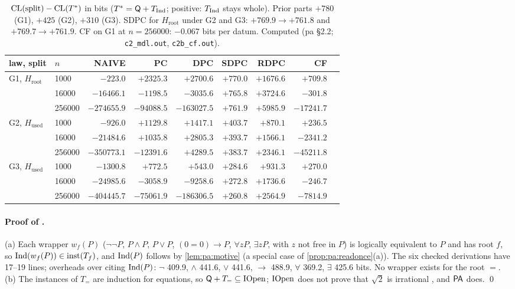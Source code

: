 \begin{table}[ht]\centering\footnotesize
\begin{tabular}{@{}llrrrrrrr@{}}
\toprule
law, split & $n$ & NAIVE & PC & DPC & SDPC & RDPC & CF\\
\midrule
G1, $H_{\mathrm{root}}$ & 1000 & $-223.0$ & $+2325.3$ & $+2700.6$ & $+770.0$ & $+1676.6$ & $+709.8$\\
 & 16000 & $-16466.1$ & $-1198.5$ & $-3035.6$ & $+765.8$ & $+3724.6$ & $-301.8$\\
 & 256000 & $-274655.9$ & $-94088.5$ & $-163027.5$ & $+761.9$ & $+5985.9$ & $-17241.7$\\
G2, $H_{\mathrm{used}}$ & 1000 & $-926.0$ & $+1129.8$ & $+1417.1$ & $+403.7$ & $+870.1$ & $+236.5$\\
 & 16000 & $-21484.6$ & $+1035.8$ & $+2805.3$ & $+393.7$ & $+1566.1$ & $-2341.2$\\
 & 256000 & $-350773.1$ & $-12391.6$ & $+4289.5$ & $+383.7$ & $+2346.1$ & $-45211.8$\\
G3, $H_{\mathrm{used}}$ & 1000 & $-1300.8$ & $+772.5$ & $+543.0$ & $+284.6$ & $+931.3$ & $+270.0$\\
 & 16000 & $-24985.6$ & $-3058.9$ & $-9258.6$ & $+272.8$ & $+1736.6$ & $-246.7$\\
 & 256000 & $-404445.7$ & $-75061.9$ & $-186306.5$ & $+260.8$ & $+2564.9$ & $-7814.9$\\
\bottomrule
\end{tabular}
\caption{$\mathrm{CL}(\text{split})-\mathrm{CL}(T^*)$ in bits ($T^*=\mathsf{Q}+T_{\mathrm{Ind}}$; positive: $T_{\mathrm{Ind}}$ stays whole). Prior parts $+780$ (G1), $+425$ (G2), $+310$ (G3). SDPC for $H_{\mathrm{root}}$ under G2 and G3: $+769.9\to+761.8$ and $+769.7\to+761.9$. CF on G1 at $n=256000$: $-0.067$ bits per datum. Computed (pa \S2.2; \texttt{c2\_mdl.out}, \texttt{c2b\_cf.out}).}\label{tab:pa:mdl}
\end{table}

\paragraph{Proof of .} (a) Each wrapper $w_f(P)$ ($\neg\neg P$, $P\wedge P$, $P\vee P$, $(0=0)\to P$, $\forall zP$, $\exists zP$, with $z$ not free in $P$) is logically equivalent to $P$ and has root $f$, so $\mathrm{Ind}(w_f(P))\in\mathrm{inst}(T_f)$, and $\mathrm{Ind}(P)$ follows by \cref{lem:pa:motive} (a special case of \cref{prop:pa:readonce}(a)). The six checked derivations have 17--19 lines; overheads over citing $\mathrm{Ind}(P)$: $\neg$ 409.9, $\wedge$ 441.6, $\vee$ 441.6, $\to$ 488.9, $\forall$ 369.2, $\exists$ 425.6 bits. No wrapper exists for the root $=$. (b) The instances of $T_=$ are induction for equations, so $\mathsf{Q}+T_=\subseteq\mathrm{IOpen}$; $\mathrm{IOpen}$ does not prove that $\sqrt2$ is irrational \citep{shepherdson1964nonstandard}, and $\mathsf{PA}$ does. \qed

